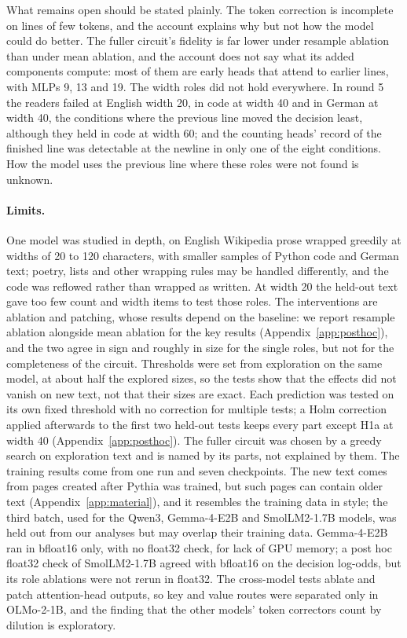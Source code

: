 \documentclass[11pt,a4paper]{article}
\begin{document}
What remains open should be stated plainly. The token correction is incomplete on lines of few tokens, and the account explains why but not how the model could do better. The fuller circuit's fidelity is far lower under resample ablation than under mean ablation, and the account does not say what its added components compute: most of them are early heads that attend to earlier lines, with MLPs 9, 13 and 19. The width roles did not hold everywhere. In round 5 the readers failed at English width 20, in code at width 40 and in German at width 40, the conditions where the previous line moved the decision least, although they held in code at width 60; and the counting heads' record of the finished line was detectable at the newline in only one of the eight conditions. How the model uses the previous line where these roles were not found is unknown.

\paragraph{Limits.}
One model was studied in depth, on English Wikipedia prose wrapped greedily at widths of 20 to 120 characters, with smaller samples of Python code and German text; poetry, lists and other wrapping rules may be handled differently, and the code was reflowed rather than wrapped as written. At width 20 the held-out text gave too few count and width items to test those roles. The interventions are ablation and patching, whose results depend on the baseline: we report resample ablation alongside mean ablation for the key results (Appendix~\ref{app:posthoc}), and the two agree in sign and roughly in size for the single roles, but not for the completeness of the circuit. Thresholds were set from exploration on the same model, at about half the explored sizes, so the tests show that the effects did not vanish on new text, not that their sizes are exact. Each prediction was tested on its own fixed threshold with no correction for multiple tests; a Holm correction applied afterwards to the first two held-out tests keeps every part except H1a at width 40 (Appendix~\ref{app:posthoc}). The fuller circuit was chosen by a greedy search on exploration text and is named by its parts, not explained by them. The training results come from one run and seven checkpoints. The new text comes from pages created after Pythia was trained, but such pages can contain older text (Appendix~\ref{app:material}), and it resembles the training data in style; the third batch, used for the Qwen3, Gemma-4-E2B and SmolLM2-1.7B models, was held out from our analyses but may overlap their training data. Gemma-4-E2B ran in bfloat16 only, with no float32 check, for lack of GPU memory; a post hoc float32 check of SmolLM2-1.7B agreed with bfloat16 on the decision log-odds, but its role ablations were not rerun in float32. The cross-model tests ablate and patch attention-head outputs, so key and value routes were separated only in OLMo-2-1B, and the finding that the other models' token correctors count by dilution is exploratory.
\end{document}
